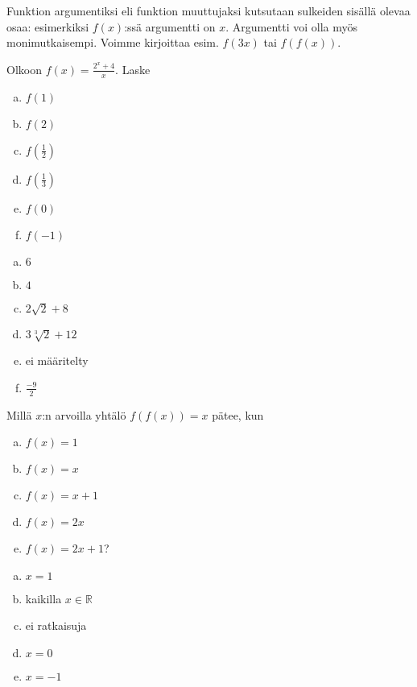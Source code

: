 \begin{esimerkki}
Funktion argumentiksi eli funktion muuttujaksi kutsutaan sulkeiden sisällä olevaa osaa: esimerkiksi $f(x)$:ssä argumentti on $x$. Argumentti voi olla myös monimutkaisempi. Voimme kirjoittaa esim. $f(3x)$ tai $f(f(x))$.
\end{esimerkki}


\begin{tehtava}
Olkoon $f(x)=\frac{2^x+4}{x}$. Laske
\begin{enumerate}[(a)]
\item $f(1)$
\item $f(2)$
\item $f(\frac{1}{2})$
\item $f(\frac{1}{3})$
\item $f(0)$
\item $f(-1)$
\end{enumerate}
\begin{vastaus}
\begin{enumerate}[(a)]
\item $6$
\item $4$
\item $2\sqrt{2}+8$
\item $3\sqrt[3]{2}+12$
\item ei määritelty
\item $\frac{-9}{2}$
\end{enumerate}
\end{vastaus}
\end{tehtava}

\begin{tehtava}
Millä $x$:n arvoilla yhtälö $f(f(x)) = x$ pätee, kun
\begin{enumerate}[(a)]
\item $f(x) = 1$
\item $f(x) = x$
\item $f(x) = x+1$
\item $f(x) = 2x$
\item $f(x) = 2x+1$?
\end{enumerate}
\begin{vastaus}
\begin{enumerate}[(a)]
\item $x = 1$
\item kaikilla $x\in\mathbb{R}$
\item ei ratkaisuja
\item $x = 0$
\item $x = -1$
\end{enumerate}
\end{vastaus}
\end{tehtava}

